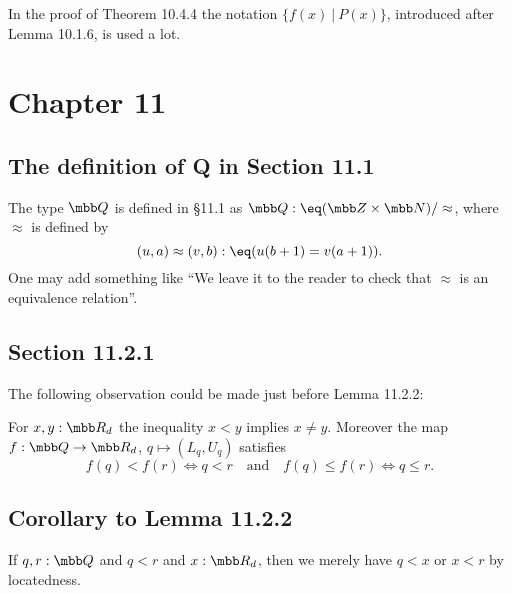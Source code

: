 \documentclass[12pt]{article}
\begin{document}
In the proof of Theorem 10.4.4 the notation $\{f(x)\ \vert\ P(x)\}$, introduced after Lemma 10.1.6, is used a lot.


\section{Chapter 11}

\subsection{The definition of Q in Section 11.1}

The type $\mbb Q$ is defined in \S11.1 as $\mbb Q:\eq(\mbb Z\times\mbb N)/\approx$, where $\approx$ is defined by 
$$
(u,a)\approx(v,b):\eq(u(b+1)=v(a+1)).
$$ 
One may add something like ``We leave it to the reader to check that $\approx$ is an equivalence relation''.


\subsection{Section 11.2.1}

The following observation could be made just before Lemma 11.2.2: 

For $x,y:\mbb R_d$ the inequality $x<y$ implies $x\neq y$. Moreover the map $f:\mbb Q\to\mbb R_d$, $q\mapsto(L_q,U_q)$ satisfies
$$
f(q)<f(r)\iff q<r\quad\text{and}\quad f(q)\le f(r)\iff q\le r.
$$ 





\subsection{Corollary to Lemma 11.2.2}\label{1122}

If $q,r:\mbb Q$ and $q<r$ and $x:\mbb R_d$, then we merely have $q<x$ or $x<r$ by locatedness.
\end{document}
